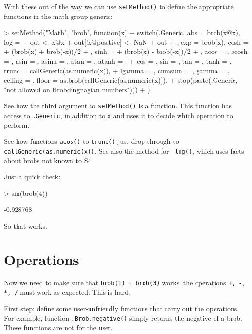 \documentclass[a4paper]{article}
\begin{document}
With these out of the way we can use {\tt setMethod()} to define the 
appropriate functions in the math group generic:

\begin{Schunk}
\begin{Sinput}
> setMethod("Math", "brob", function(x) {
+     switch(.Generic, abs = brob(x@x), log = {
+         out <- x@x
+         out[!x@positive] <- NaN
+         out
+     }, exp = brob(x), cosh = {
+         (brob(x) + brob(-x))/2
+     }, sinh = {
+         (brob(x) - brob(-x))/2
+     }, acos = , acosh = , asin = , asinh = , atan = , atanh = , 
+         cos = , sin = , tan = , tanh = , trunc = callGeneric(as.numeric(x)), 
+         lgamma = , cumsum = , gamma = , ceiling = , floor = as.brob(callGeneric(as.numeric(x))), 
+         stop(paste(.Generic, "not allowed on Brobdingnagian numbers")))
+ })
\end{Sinput}
\end{Schunk}

See how the third argument to {\tt setMethod()} is a function.  This
function has access to {\tt .Generic}, in addition to {\tt x} and uses
it to decide which operation to perform.

See how functions {\tt acos()} to {\tt trunc()} just drop through to
{\tt callGeneric(as.numeric(x))}.  See also the method for {\tt
log()}, which uses facts about brobs not known to S4.

Just a quick check:

\begin{Schunk}
\begin{Sinput}
> sin(brob(4))
\end{Sinput}
\begin{Soutput}
[1] -0.928768
\end{Soutput}
\end{Schunk}

So that works.

\section{Operations}

Now we need to make sure that {\tt brob(1) + brob(3)} works: the
operations {\tt +, -, *, /} must work as expected.  This is hard.

First step: define some user-unfriendly functions that carry out the
operations.  For example, function {\tt .Brob.negative()} simply
returns the negative of a brob.  These functions are not for the user.
\end{document}
